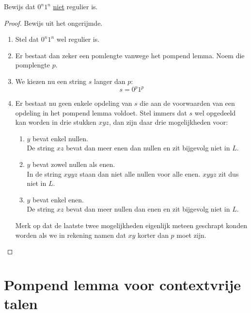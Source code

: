 \documentclass[main.tex]{subfiles}
\begin{document}
\begin{vb}
  Bewijs dat $0^{n}1^{n}$ \underline{niet} regulier is.
  \begin{proof}
    Bewijs uit het ongerijmde.
    \begin{enumerate}
    \item Stel dat $0^{n}1^{n}$ wel regulier is.
    \item Er bestaat dan zeker een pomlengte vanwege het pompend lemma.
      Noem die pomplengte $p$.
    \item We kiezen nu een string $s$ langer dan $p$:
      \[ s = 0^{p}1^{p} \]
    \item Er bestaat nu geen enkele opdeling van $s$ die aan de voorwaarden van een opdeling in het pompend lemma voldoet.
      Stel immers dat $s$ wel opgedeeld kan worden in drie stukken $xyz$, dan zijn daar drie mogelijkheden voor:
      \begin{enumerate}
      \item $y$ bevat enkel nullen.\\
        De string $xz$ bevat dan meer enen dan nullen en zit bijgevolg niet in $L$.
      \item $y$ bevat zowel nullen als enen.\\
        In de string $xyyz$ staan dan niet alle nullen voor alle enen. $xyyz$ zit dus niet in $L$. 
      \item $y$ bevat enkel enen.\\
        De string $xz$ bevat dan meer nullen dan enen en zit bijgevolg niet in $L$.
      \end{enumerate}
      Merk op dat de laatste twee mogelijkheden eigenlijk meteen geschrapt konden worden als we in rekening namen dat $xy$ korter dan $p$ moet zijn.
    \end{enumerate}
  \end{proof}
\end{vb}

\section{Pompend lemma voor contextvrije talen}
\label{sec:pompend-lemma-voor-contextvrije-talen}
\end{document}
